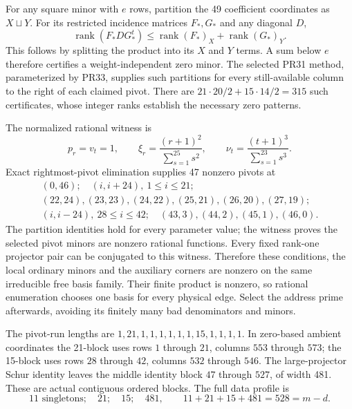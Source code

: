 For any square minor with $e$ rows, partition the 49 coefficient
coordinates as $X\sqcup Y$. For its restricted incidence matrices
$F_*,G_*$ and any diagonal $D$,
\[
 \operatorname{rank}(F_*DG_*^t)
 \le\operatorname{rank}(F_*)_X+\operatorname{rank}(G_*)_Y.
\]
This follows by splitting the product into its $X$ and $Y$ terms.
A sum below $e$ therefore certifies a weight-independent zero minor.
The selected PR31 method, parameterized by PR33, supplies such
partitions for every still-available column to the right of each
claimed pivot. There are $21\cdot20/2+15\cdot14/2=315$ such
certificates, whose integer ranks establish the necessary zero patterns.

The normalized rational witness is
\[
 p_r=v_t=1,\qquad
 \xi_r=\frac{(r+1)^2}{\sum_{s=1}^{25}s^2},\qquad
 \nu_t=\frac{(t+1)^3}{\sum_{s=1}^{23}s^3}.
\]
Exact rightmost-pivot elimination supplies 47 nonzero pivots at
\[
\begin{gathered}
 (0,46);\quad (i,i+24),\ 1\le i\le21;\\
 (22,24),(23,23),(24,22),(25,21),(26,20),(27,19);\\
 (i,i-24),\ 28\le i\le42;\quad(43,3),(44,2),(45,1),(46,0).
\end{gathered}
\]
The partition identities hold for every parameter value; the witness
proves the selected pivot minors are nonzero rational functions.
Every fixed rank-one projector pair can be conjugated to this witness.
Therefore these conditions, the local ordinary minors and the auxiliary
corners are nonzero on the same irreducible free basis family. Their
finite product is nonzero, so rational enumeration chooses one basis
for every physical edge. Select the address prime afterwards, avoiding
its finitely many bad denominators and minors.

The pivot-run lengths are
$1,21,1,1,1,1,1,1,15,1,1,1,1$.
In zero-based ambient coordinates the 21-block uses rows $1$ through
$21$, columns $553$ through $573$; the 15-block uses rows $28$ through
$42$, columns $532$ through $546$. The large-projector Schur identity
leaves the middle identity block $47$ through $527$, of width 481.
These are actual contiguous ordered blocks. The full data profile is
\[
 11\text{ singletons};\quad21;\quad15;\quad481,
 \qquad11+21+15+481=528=m-d.
\]

